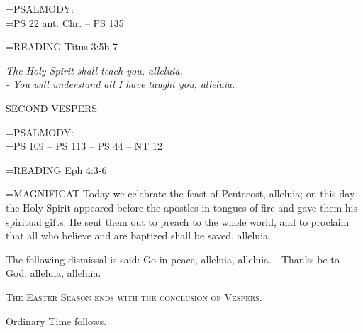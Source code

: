\hangindent=\parindent \small{PSALMODY:}\\
\hangindent=\parindent  PS 22 ant. Chr. -- PS 135\vspace{0.5em}

\hangindent=\parindent \small{\uppercase{READING}}	Titus 3:5b-7 \textbf{\\}

\begin{center}
\textit{The Holy Spirit shall teach you, alleluia.\\
- You will understand all I have taught you, alleluia.}
\end{center}

\begin{flushleft}\normalsize SECOND VESPERS\\\end{flushleft}

\hangindent=\parindent \small{PSALMODY:}\\
\hangindent=\parindent  PS 109 -- PS 113 -- PS 44 -- NT 12\vspace{0.5em}

\hangindent=\parindent \small{\uppercase{READING}}	Eph 4:3-6 \textbf{\\}

\hangindent=\parindent \small{MAGNIFICAT 	Today we celebrate the feast of Pentecost, alleluia; on this day the Holy Spirit appeared before the apostles in tongues of fire and gave them his spiritual gifts. He sent them out to preach to the whole world, and to proclaim that all who believe and are baptized shall be saved, alleluia.\\}

The following dismissal is said:
Go in peace, alleluia, alleluia.
- Thanks be to God, alleluia, alleluia.

\begin{center}\noindent\textsc{\small{The Easter Season ends with the conclusion of Vespers.\\}}\end{center}
Ordinary Time follows.
